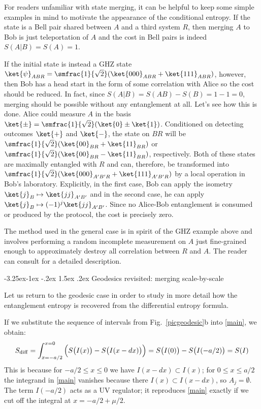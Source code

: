 \documentclass[12pt]{article}
\makeatletter
\renewcommand\subsection{\@startsection{subsection}{2}{\z@}%
                                     {-3.25ex\@plus -1ex \@minus -.2ex}%
                                     {1.5ex \@plus .2ex}%
                                     {\normalfont\bfseries}}
\def\sdiff{S_{\rm diff}}
\newcommand{\figref}[1]{Fig.~\ref{#1}}
\makeatother
\begin{document}
For readers unfamiliar with state merging, it can be helpful to keep some simple examples in mind to motivate the appearance of the conditional entropy. If the state is a Bell pair shared between $A$ and a third system $R$, then merging $A$ to Bob is just teleportation of $A$ and the cost in Bell pairs is indeed $S(A|B) = S(A) = 1$.

If the initial state is instead a GHZ state $\ket{\psi}_{ABR} = \smfrac{1}{\sqrt{2}} ( \ket{000}_{ABR} + \ket{111}_{ABR})$, however, then Bob has a head start in the form of some correlation with Alice so the cost should be reduced. In fact, since $S(A|B) = S(AB) - S(B) = 1 -1 = 0$, merging should be possible without any entanglement at all.
%
Let's see how this is done. Alice could measure $A$ in the basis $\ket{\pm} = \smfrac{1}{\sqrt{2}} ( \ket{0} \pm \ket{1} )$. Conditioned on detecting outcomes $\ket{+}$ and $\ket{-}$, the state on $BR$ will be $\smfrac{1}{\sqrt{2}} ( \ket{00}_{BR} + \ket{11}_{BR} )$ or $\smfrac{1}{\sqrt{2}} ( \ket{00}_{BR} - \ket{11}_{BR} )$, respectively. Both of these states are maximally entangled with $R$ and can, therefore, be transformed into $\smfrac{1}{\sqrt{2}} ( \ket{000}_{A'B'R} + \ket{111}_{A'B'R} )$ by a local operation in Bob's laboratory. Explicitly, in the first case, Bob can apply the isometry $\ket{j}_B \mapsto \ket{jj}_{A'B'}$ and in the second case, he can apply $\ket{j}_B \mapsto (-1)^j \ket{jj}_{A'B'}$. Since no Alice-Bob entanglement is consumed or produced by the protocol, the cost is precisely zero.

The method used in the general case is in spirit of the GHZ example above and involves performing a random incomplete measurement on $A$ just fine-grained enough to approximately destroy all correlation between $R$ and $A$. The reader can consult \cite{horodecki2007quantum} for a detailed description.

\subsection{Geodesics revisited: merging scale-by-scale}
\label{scalebyscale}

Let us return to the geodesic case in order to study in more detail how the entanglement entropy is recovered from the differential entropy formula.

If we substitute the sequence of intervals from \figref{picgeodesic}b into \eqref{main}, we obtain:
\begin{equation}
\sdiff = \int_{x = -a/2}^{x=0} \Big( S\big(I(x)\big) - S\big(I(x-dx)\big)\Big)  = S\big(I(0)\big) - S\big(I(-a/2)\big) = S(I)
\label{geodlength}
\end{equation}
This is because for  $-a/2 \leq x \leq 0$ we have $I(x-dx) \subset I(x)$; for $0 \leq x \leq a/2$ the integrand in \eqref{main} vanishes because there $I(x) \subset I(x-dx)$, so $A_j = \emptyset$. The term $I(-a/2)$ acts as a UV regulator; it reproduces \eqref{main} exactly if we cut off the integral at $x = -a/2 + \mu/2$.
\end{document}
